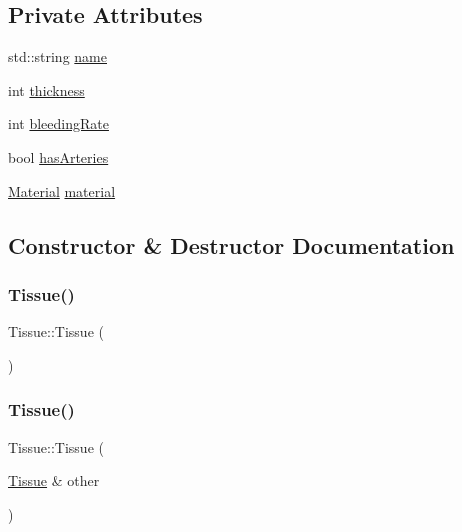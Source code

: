 \subsection*{Private Attributes}
\begin{DoxyCompactItemize}
\item 
std\+::string \mbox{\hyperlink{class_tissue_aae2dc58365b59cda8cdf3650c0937010}{name}}
\item 
int \mbox{\hyperlink{class_tissue_ad5a7bcb3d7be674cfbe59db370357f6c}{thickness}}
\item 
int \mbox{\hyperlink{class_tissue_af358eeb02bde72f68ae5428061255f51}{bleeding\+Rate}}
\item 
bool \mbox{\hyperlink{class_tissue_af8e53814291b8953861a395f4e8d16ef}{has\+Arteries}}
\item 
\mbox{\hyperlink{class_material}{Material}} \mbox{\hyperlink{class_tissue_a1e74c23f6a44a241639ebf83ec0017d0}{material}}
\end{DoxyCompactItemize}


\subsection{Constructor \& Destructor Documentation}
\mbox{\label{class_tissue_a8f46af4ca215ac9e799fa42b419a5ce9}} 
\subsubsection{\texorpdfstring{Tissue()}{Tissue()}\hspace{0.1cm}{\footnotesize\ttfamily [1/3]}}
{\footnotesize\ttfamily Tissue\+::\+Tissue (\begin{DoxyParamCaption}{ }\end{DoxyParamCaption})}

\mbox{\label{class_tissue_a16e3bb6ef9c3f04507a3b1f28da5d283}} 
\subsubsection{\texorpdfstring{Tissue()}{Tissue()}\hspace{0.1cm}{\footnotesize\ttfamily [2/3]}}
{\footnotesize\ttfamily Tissue\+::\+Tissue (\begin{DoxyParamCaption}\item[{\mbox{\hyperlink{class_tissue}{Tissue}} \&}]{other }\end{DoxyParamCaption})}

